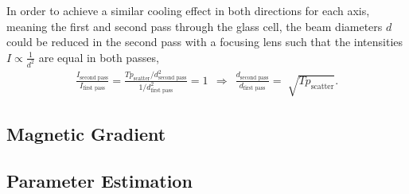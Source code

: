 In order to achieve a similar cooling effect in both directions for each axis, meaning the first and second pass through the glass cell, the beam diameters $d$ could be reduced in the second pass with a focusing lens such that the intensities $I \propto \frac{1}{d^2}$ are equal in both passes,
\begin{align}
\frac{I_\text{second pass}}{I_\text{first pass}} =  \frac{T p_\text{scatter} / d^2_\text{second pass}}{1/ d^2_\text{first pass}} = 1 ~~\Rightarrow~~ \frac{d_\text{second pass}}{d_\text{first pass}} = \sqrt[]{T p_\text{scatter}}.
\end{align}


\subsection*{Magnetic Gradient}

\subsection*{Parameter Estimation}
